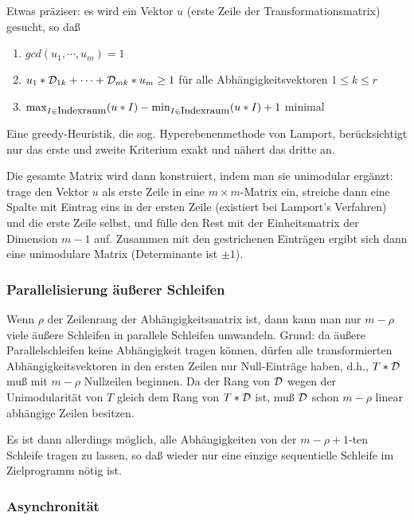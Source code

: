 Etwas präziser: es wird ein Vektor $u$ (erste Zeile der
Transformationsmatrix) gesucht, so daß
\begin{enumerate}
\item $gcd(u_1,\cdots,u_m) = 1$\\[-7mm]
\item $u_1*{\cal D}_{1k} + \cdots + {\cal D}_{mk}*u_m \geq 1$ für alle
  Abhängigkeitsvektoren $1\!\leq\!k\!\leq\!r$\\[-7mm]
\item $\max_{I\in \textrm{\small Indexraum}}(u*I) - \min_{I\in
    \textrm{\small Indexraum}}(u*I) + 1$ minimal
\end{enumerate}

Eine greedy-Heuristik, die sog. Hyperebenenmethode von Lamport,
berücksichtigt nur das erste und zweite Kriterium exakt und nähert das
dritte an.

\smallskip 

Die gesamte Matrix wird dann konstruiert, indem man sie unimodular
ergänzt: trage den Vektor $u$ als erste Zeile in eine
$m\!\times\!m$-Matrix ein, streiche dann eine Spalte mit Eintrag eins in
der ersten Zeile (existiert bei Lamport's Verfahren) und die erste Zeile
selbst, und fülle den Rest mit der Einheitsmatrix der Dimension
$m\!-\!1$ auf. Zusammen mit den gestrichenen Einträgen ergibt sich dann
eine unimodulare Matrix (Determinante ist $\pm 1$).


\subsubsection{Parallelisierung äußerer Schleifen}
\label{sec:pas}

Wenn $\rho$ der Zeilenrang der Abhängigkeitsmatrix ist, dann kann man
nur $m\!-\!\rho$ viele äußere Schleifen in parallele Schleifen umwandeln.
Grund: da äußere Parallelschleifen keine Abhängigkeit tragen können,
dürfen alle transformierten Abhängigkeitsvektoren in den ersten Zeilen
nur Null-Einträge haben, d.h., $T*\cal D$ muß mit $m\!-\!\rho$
Nullzeilen beginnen. Da der Rang von $\cal D$ wegen der Unimodularität
von $T$ gleich dem Rang von $T*\cal D$ ist, muß $\cal D$ schon $m\!-\!\rho$
linear abhängige Zeilen besitzen.

Es ist dann allerdings möglich, alle Abhängigkeiten von der
$m\!-\!\rho\!+\!1$-ten Schleife tragen zu lassen, so daß wieder nur eine
einzige sequentielle Schleife im Zielprogramm nötig ist.

\subsubsection{Asynchronität}

